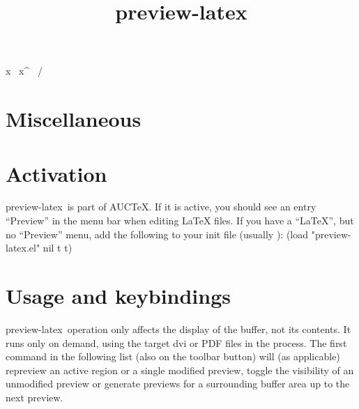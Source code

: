 \twocol
\keycs{}
\keycs{}
\keycs{}
\keycs{}
\keycs\leq{<}
\keycs\geq{>}
\keycs\tilde x{\string~}
\keycs\hat x{^}
\keycs{}
\keycs{}
\keycs{}
\keycs{}
\keycs\not \ {/}
\keycs{}
\keycs\times{*}
\keycs{}
\keycs\colon{:}
\keycs\subset{\{}
\keycs\supset{\}}
\keycs\subseteq{[}
\keycs\supseteq{]}
\keycs{}
\keycs\setminus{\\}
\keycs\cup{+}
\keycs\cap{-}
\keycs\langle{(}
\keycs\rangle{)}
\keycs{}
\keycs{}
\keycs{}
\keycs{}
\keycs{}
\keycs{}
\keycs{}
\keycs{}
\keycs\vee{|}
\keycs\wedge{\&}

\section{Miscellaneous}


\newcolumn

\def\previewlatex{{preview-latex}}
\title{\previewlatex}
\section{Activation}
\previewlatex\ is part of AUC\TeX.  If it is active, you should see an
entry ``Preview'' in the menu bar when editing \LaTeX{} files.  If you
have a ``LaTeX'', but no ``Preview'' menu, add the following to your
init file (usually ):
\beginexample
(load "preview-latex.el" nil t t)
\endexample

\section{Usage and keybindings}
\previewlatex\ operation only affects the display of the buffer, not
its contents.  It runs only on demand, using the target {\sc dvi} or
{\sc PDF} files in the process.  The first command in the following
list (also on the toolbar button) will (as applicable) repreview an
active region or a single modified preview, toggle the visibility of
an unmodified preview or generate previews for a surrounding buffer
area up to the next preview.


